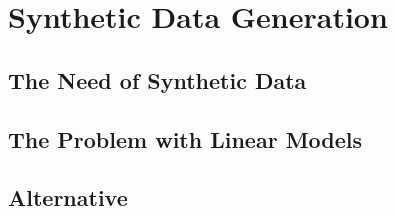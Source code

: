\chapter{Synthetic Data Generation}
\label{chap:Synthetic}

\section{The Need of Synthetic Data}
\section{The Problem with Linear Models}
\section{Alternative}
